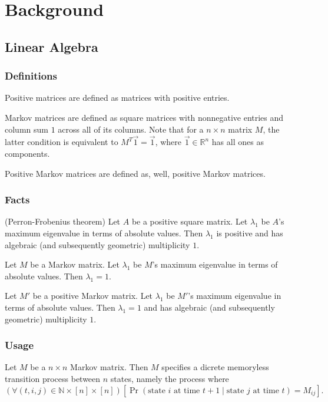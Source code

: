 \documentclass[12pt, titlepage, twoside]{amsart}
\newcommand{\R}{\ensuremath{\mathbb R}}
\newcommand{\N}{\ensuremath{\mathbb N}}
\begin{document}
\tableofcontents

\clearpage

\section{Background}

\subsection{Linear Algebra}

\subsubsection{Definitions}

Positive matrices are defined as matrices with positive entries.

Markov matrices are defined as square matrices with nonnegative entries and column sum $1$ across all of its columns.
Note that for a $n\times n$ matrix $M$, the latter condition is equivalent to $M^T\vec{1} = \vec{1}$,
where $\vec{1}\in\R^n$ has all ones as components.

Positive Markov matrices are defined as, well, positive Markov matrices.

\subsubsection{Facts}

(Perron-Frobenius theorem)
Let $A$ be a positive square matrix.
Let $\lambda_1$ be $A$'s maximum eigenvalue in terms of absolute values.
Then $\lambda_1$ is positive and has algebraic (and subsequently geometric) multiplicity $1$.~\cite{perron}

Let $M$ be a Markov matrix.
Let $\lambda_1$ be $M$'s maximum eigenvalue in terms of absolute values.
Then $\lambda_1 = 1$.~\cite{strang}

Let $M'$ be a positive Markov matrix.
Let $\lambda_1$ be $M'$'s maximum eigenvalue in terms of absolute values.
Then $\lambda_1 = 1$ and has algebraic (and subsequently geometric) multiplicity $1$.

\subsubsection{Usage}

Let $M$ be a $n\times n$ Markov matrix.
Then $M$ specifies a dicrete memoryless transition process between $n$ states, namely the process where
\[
  \left(\forall (t, i, j)\in\N\times[n]\times[n]\right)
  \left[\Pr(\text{state }i\text{ at time }t + 1\mid \text{state }j\text{ at time }t) = M_{ij}\right].
\]
\end{document}
